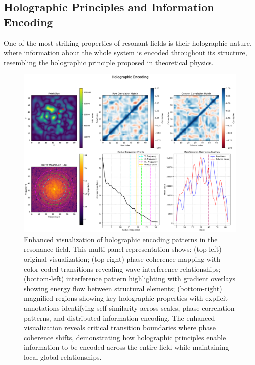 \documentclass[12pt,letterpaper]{article}
\begin{document}
\vspace{2mm}
\subsection{Holographic Principles and Information Encoding}
\label{subsec:holographic_principles}

One of the most striking properties of resonant fields is their holographic nature, where information about the whole system is encoded throughout its structure, resembling the holographic principle proposed in theoretical physics.

\begin{figure}[H]
    \centering
    \includegraphics[width=\textwidth]{figures/holographic_encoding.png}
    \caption{Enhanced visualization of holographic encoding patterns in the resonance field. This multi-panel representation shows: (top-left) original visualization; (top-right) phase coherence mapping with color-coded transitions revealing wave interference relationships; (bottom-left) interference pattern highlighting with gradient overlays showing energy flow between structural elements; (bottom-right) magnified regions showing key holographic properties with explicit annotations identifying self-similarity across scales, phase correlation patterns, and distributed information encoding. The enhanced visualization reveals critical transition boundaries where phase coherence shifts, demonstrating how holographic principles enable information to be encoded across the entire field while maintaining local-global relationships.}
    \label{fig:holographic}
\end{figure}
\end{document}
